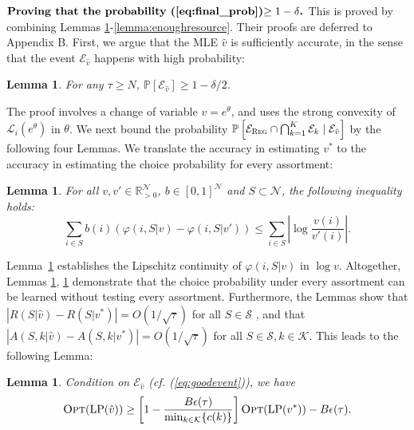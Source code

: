 \documentclass{article}
\newtheorem{lemma}[theorem]{Lemma}
\theoremstyle{definition}
\newcommand{\PPP}{\mathbb{P}}
\newcommand{\KKK}{\mathcal{K}}
\newcommand{\NNN}{\mathcal{N}}
\newcommand{\RRR}{\mathbb{R}}
\newcommand{\SSS}{\mathcal{S}}
\begin{document}
$\textbf{Proving that the probability (\ref{eq:final_prob})$\geq 1-\delta$.}$ This is proved by combining Lemmas \ref{lemma:goodevent}-\ref{lemma:enoughresource}. Their proofs are deferred to Appendix B. First, we argue that the MLE $\hat{v}$ is sufficiently accurate, in the sense that the event $\mathcal{E}_{\hat{v}}$ happens with high probability:
\begin{lemma}\label{lemma:goodevent}
For any $\tau \geq N$, $\PPP[\mathcal{E}_{\hat{v}}]\geq 1 - \delta/2$.
\end{lemma}
The proof involves a change of variable $v = e^\theta$, and uses the strong convexity of $\mathcal{L}_i(e^\theta)$ in $\theta$. We next bound the probability $\PPP\left[\mathcal{E}_{\text{{\sc Reg}}} \cap \bigcap^{K}_{k=1} \mathcal{E}_{k} \mid \mathcal{E}_{\hat{v}}\right]$ by the following four Lemmas. We translate the accuracy in estimating $v^*$ to the accuracy in estimating the choice probability for every assortment:
\begin{lemma}\label{lemma:lipschitz}
For all $v, v' \in \RRR^\NNN_{>0}$, $b\in [0,1]^\NNN$ and $S\subset \NNN$, the following inequality holds: $$\sum_{i \in S}b(i)\left(\varphi(i, S |v) - \varphi(i, S |v')\right) \leq \sum_{i\in S} \left|\log\frac{v(i)}{v'(i)}\right|.$$
\end{lemma}
Lemma~\ref{lemma:lipschitz} establishes the Lipschitz continuity of $\varphi(i, S|v)$ in $\log v$. Altogether, Lemmas \ref{lemma:goodevent}, \ref{lemma:lipschitz} demonstrate that the choice probability under every assortment can be learned without testing every assortment. Furthermore, the Lemmas show that $\left| R(S|\hat{v}) - R(S|v^*)\right| = O(1/\sqrt{\tau})$ for all $S\in \SSS$ %
, and that $\left| A(S, k|\hat{v}) - A(S, k|v^*)\right| = O(1/\sqrt{\tau})$ for all $S\in \SSS, k\in \KKK$. %
This leads to the following Lemma:
\begin{lemma}\label{lemma:goodupperbound}
Condition on $\mathcal{E}_{\hat{v}}$ (cf. (\ref{eq:goodevent})), we have $$
\text{{\sc Opt}}(\text{LP}(\hat{v}))  \geq \left[1 - \frac{B\epsilon(\tau)}{\min_{k\in\KKK}\{c(k)\}}\right]\text{{\sc Opt}}(\text{LP}(v^*)) - B\epsilon(\tau). $$
\end{lemma}
\end{document}
